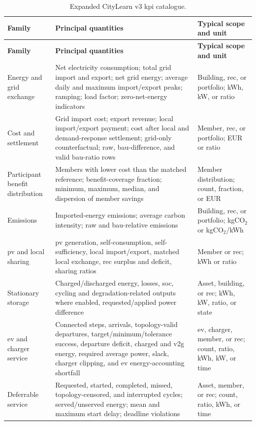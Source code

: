 {\scriptsize
\setlength{\tabcolsep}{3pt}
\begin{longtable}{@{}p{}p{}p{}@{}}
\caption{Expanded CityLearn v3 \gls{kpi} catalogue.}\label{tab:app-simulator-kpi-catalogue}\\
\toprule
\textbf{Family} & \textbf{Principal quantities} & \textbf{Typical scope and unit} \\
\midrule
\endfirsthead
\toprule
\textbf{Family} & \textbf{Principal quantities} & \textbf{Typical scope and unit} \\
\midrule
\endhead
Energy and grid exchange & Net electricity consumption; total grid import and export; net grid energy; average daily and maximum import/export peaks; ramping; load factor; zero-net-energy indicators & Building, \gls{rec}, or portfolio; kWh, kW, or ratio \\
Cost and settlement & Grid import cost; export revenue; local import/export payment; cost after local and demand-response settlement; grid-only counterfactual; raw, \gls{bau}-difference, and valid \gls{bau}-ratio rows & Member, \gls{rec}, or portfolio; EUR or ratio \\
Participant benefit distribution & Members with lower cost than the matched reference; benefit-coverage fraction; minimum, maximum, median, and dispersion of member savings & Member distribution; count, fraction, or EUR \\
Emissions & Imported-energy emissions; average carbon intensity; raw and \gls{bau}-relative emissions & Building, \gls{rec}, or portfolio; kgCO$_2$ or kgCO$_2$/kWh \\
\gls{pv} and local sharing & \gls{pv} generation, self-consumption, self-sufficiency, local import/export, matched local exchange, \gls{rec} surplus and deficit, sharing ratios & Member or \gls{rec}; kWh or ratio \\
Stationary storage & Charged/discharged energy, losses, \gls{soc}, cycling and degradation-related outputs where enabled, requested/applied power difference & Asset, building, or \gls{rec}; kWh, kW, ratio, or state \\
\gls{ev} and charger service & Connected steps, arrivals, topology-valid departures, target/minimum/tolerance success, departure deficit, charged and \gls{v2g} energy, required average power, slack, charger clipping, and \gls{ev} energy-accounting shortfall & \gls{ev}, charger, member, or \gls{rec}; count, ratio, kWh, kW, or time \\
Deferrable service & Requested, started, completed, missed, topology-censored, and interrupted cycles; served/unserved energy; mean and maximum start delay; deadline violations & Asset, member, or \gls{rec}; count, ratio, kWh, or time \\

\end{longtable}}
